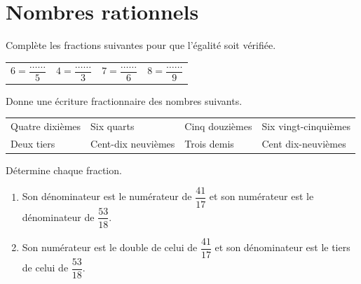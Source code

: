\documentclass[a4paper,10pt]{report}
\begin{document}
\pagestyle{empty}
\newpage
\section*{Nombres rationnels}


\begin{ex}
Complète les fractions suivantes pour que l'égalité soit vérifiée.

\bigskip
\begin{enumerate}[font=\color{exer1}]
\begin{tabular}{m{4cm}m{4cm}m{4cm}m{4cm}}
\item $6=\dfrac{\dots \dots}{5}$&
\item $4=\dfrac{\dots \dots}{3}$&
\item $7=\dfrac{\dots \dots}{6}$&
\item $8=\dfrac{\dots \dots}{9}$\\
\end{tabular}
\end{enumerate}
\end{ex}

\begin{ex}
Donne une écriture fractionnaire des nombres suivants.
\begin{enumerate}[font=\color{exer1}]
\begin{tabular}{m{3.8cm}m{3.8cm}m{3.8cm}m{3.8cm}}
\item Quatre dixièmes&
\item Six quarts &
\item Cinq douzièmes &
\item Six vingt-cinquièmes\\
\item Deux tiers&
\item Cent-dix neuvièmes&
\item Trois demis&
\item Cent dix-neuvièmes\\
\end{tabular}
\end{enumerate}
\end{ex}

\begin{ex}
Détermine chaque fraction.
\begin{enumerate}[font=\color{exer2}]
\item Son dénominateur est le numérateur de $\dfrac{41}{17}$ et son numérateur est le dénominateur de $\dfrac{53}{18}$.
\item Son numérateur est le double de celui de $\dfrac{41}{17}$ et son dénominateur est le tiers de celui de $\dfrac{53}{18}$.
\end{enumerate}
\end{ex}
\end{document}

